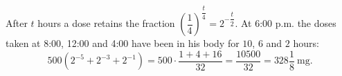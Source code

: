 After $t$ hours a dose retains the fraction $\left(\dfrac{1}{4}\right)^{\dfrac {t}{4}}=2^{-\dfrac {t}{2}}$. At 6:00 p.m. the doses taken at 8:00, 12:00 and 4:00 have been in his body for $10$, $6$ and $2$ hours:
\[500\left(2^{-5}+2^{-3}+2^{-1}\right)=500\cdot\dfrac{1+4+16}{32}=\dfrac{10500}{32}=\boxed{328\dfrac{1}{8}}\ \text{mg}.\]

